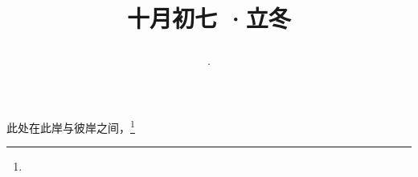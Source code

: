 \title{\date[d=7,m=11,y=2024][year:cn-y,年,month:cn,day:cn,日,·,weekday]·十月初七 ·立冬}
此处在此岸与彼岸之间，\footnote{ }

